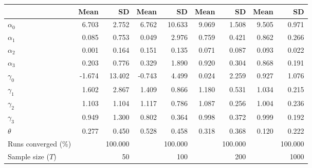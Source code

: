 
\begin{tabular}[t]{lrrrrrrrr}
\toprule
  & Mean & SD & Mean  & SD  & Mean   & SD   & Mean    & SD   \\
\midrule
$\alpha_{0}$ & 6.703 & 2.752 & 6.762 & 10.633 & 9.069 & 1.508 & 9.505 & 0.971\\
$\alpha_{1}$ & 0.085 & 0.753 & 0.049 & 2.976 & 0.759 & 0.421 & 0.862 & 0.266\\
$\alpha_{2}$ & 0.001 & 0.164 & 0.151 & 0.135 & 0.071 & 0.087 & 0.093 & 0.022\\
$\alpha_{3}$ & 0.203 & 0.776 & 0.329 & 1.890 & 0.920 & 0.304 & 0.868 & 0.191\\
$\gamma_{0}$ & -1.674 & 13.402 & -0.743 & 4.499 & 0.024 & 2.259 & 0.927 & 1.076\\
$\gamma_{1}$ & 1.602 & 2.867 & 1.409 & 0.866 & 1.180 & 0.531 & 1.034 & 0.215\\
$\gamma_{2}$ & 1.103 & 1.104 & 1.117 & 0.786 & 1.087 & 0.256 & 1.004 & 0.236\\
$\gamma_{3}$ & 0.949 & 1.300 & 0.802 & 0.364 & 0.998 & 0.372 & 0.999 & 0.192\\
$\theta$ & 0.277 & 0.450 & 0.528 & 0.458 & 0.318 & 0.368 & 0.120 & 0.222\\
Runs converged (\%) &  & 100.000 &  & 100.000 &  & 100.000 &  & 100.000\\
Sample size ($T$) &  & 50 &  & 100 &  & 200 &  & 1000\\
\bottomrule
\end{tabular}
